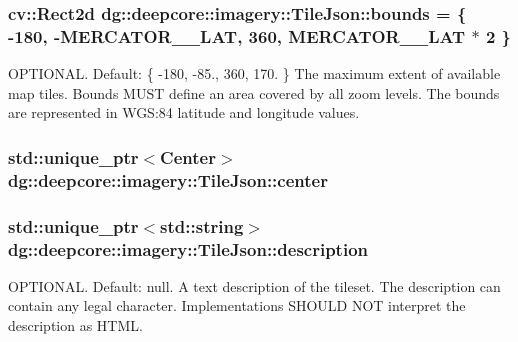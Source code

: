 \subsubsection[{\texorpdfstring{bounds}{bounds}}]{\setlength{\rightskip}{0pt plus 5cm}cv\+::\+Rect2d dg\+::deepcore\+::imagery\+::\+Tile\+Json\+::bounds = \{ -\/180, -\/M\+E\+R\+C\+A\+T\+O\+R\+\_\+\_\+\+L\+AT, 360, M\+E\+R\+C\+A\+T\+O\+R\+\_\+\_\+\+L\+AT $\ast$ 2 \}}\hypertarget{structdg_1_1deepcore_1_1imagery_1_1_tile_json_a7c0423d8989a5e6b0f5600ac5223b823}{}\label{structdg_1_1deepcore_1_1imagery_1_1_tile_json_a7c0423d8989a5e6b0f5600ac5223b823}
O\+P\+T\+I\+O\+N\+AL. Default\+: \{ -\/180, -\/85., 360, 170. \} The maximum extent of available map tiles. Bounds M\+U\+ST define an area covered by all zoom levels. The bounds are represented in W\+GS\+:84 latitude and longitude values. 
\subsubsection[{\texorpdfstring{center}{center}}]{\setlength{\rightskip}{0pt plus 5cm}std\+::unique\+\_\+ptr$<${\bf Center}$>$ dg\+::deepcore\+::imagery\+::\+Tile\+Json\+::center}\hypertarget{structdg_1_1deepcore_1_1imagery_1_1_tile_json_a774610a2770889bf336b90335a93f4c1}{}\label{structdg_1_1deepcore_1_1imagery_1_1_tile_json_a774610a2770889bf336b90335a93f4c1}
\subsubsection[{\texorpdfstring{description}{description}}]{\setlength{\rightskip}{0pt plus 5cm}std\+::unique\+\_\+ptr$<$std\+::string$>$ dg\+::deepcore\+::imagery\+::\+Tile\+Json\+::description}\hypertarget{structdg_1_1deepcore_1_1imagery_1_1_tile_json_ac2dd8a58ac978ddb8c01fbd5c7fa4820}{}\label{structdg_1_1deepcore_1_1imagery_1_1_tile_json_ac2dd8a58ac978ddb8c01fbd5c7fa4820}
O\+P\+T\+I\+O\+N\+AL. Default\+: null. A text description of the tileset. The description can contain any legal character. Implementations S\+H\+O\+U\+LD N\+OT interpret the description as H\+T\+ML. 
